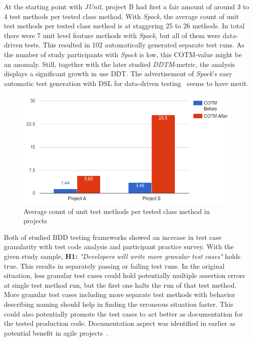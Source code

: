 At the starting point with \textit{JUnit}, project B had first a fair amount of around 3 to 4
test methods per tested class method. With \textit{Spock}, the average count of unit test methods per tested
class method is at staggering 25 to 26 methods. In total there were 7 unit level feature methods with \textit{Spock}, but all of them were
data-driven tests. This resulted in 102 automatically generated separate test runs. As the number of study participants with \textit{Spock} is low, this COTM-value might
be an anomaly. Still, together with the later studied \textit{DDTM}-metric, the analysis displays
a significant growth in use DDT. The advertisement of \textit{Spock}'s easy automatic test generation with DSL for data-driven testing~\cite{kapelonis2016java}
seems to have merit.

\begin{figure}[H]
  \begin{center}
    \includegraphics[width=12.7cm]{images/COTM.png}
    \caption{Average count of unit test methods per tested class method in projects}
    \label{fig:cotm}
  \end{center}
\end{figure}

Both of studied BDD testing frameworks showed an increase in test case granularity with test code analysis and participant practice
survey. With the given study sample, \textbf{H1:} \textit{"Developers will write more granular test cases"} holds true.
This results in separately passing or failing test runs. In the original situation, less granular test cases could hold potentially multiple
assertion errors at single test method run, but the first one halts the run of that test method. More granular test cases including more separate
test methods with behavior describing naming should help in finding the erroneous situation faster. This could also potentially
promote the test cases to act better as documentation for the tested production code. Documentation aspect was identified in earlier as potential benefit
in agile projects~\cite{runeson2006survey}.

